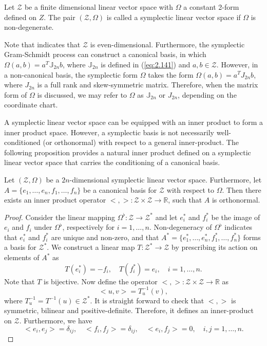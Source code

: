 \begin{definition}
Let $\mathcal Z$ be a finite dimensional linear vector space with $\Omega$ a constant 2-form defined on $Z$. The pair $(\mathcal Z,\Omega)$ is called a symplectic linear vector space if $\Omega$ is non-degenerate.
\end{definition}
Note that  indicates that $\mathcal Z$ is even-dimensional. Furthermore, the symplectic Gram-Schmidt process can construct a canonical basis, in which $\Omega(a,b) = a^T \mathbb J_{2n} b$, where $\mathbb J_{2n}$ is defined in (\ref{eq:2.141}) and $a,b\in \mathcal Z$. However, in a non-canonical basis, the symplectic form $\Omega$ takes the form $\Omega(a,b) = a^TJ_{2n}b$, where $J_{2n}$ is a full rank and skew-symmetric matrix. Therefore, when the matrix form of $\Omega$ is discussed, we may refer to $\Omega$ as $\mathbb J_{2n}$ or $J_{2n}$, depending on the coordinate chart.

A symplectic linear vector space can be equipped with an inner product to form a inner product space. However, a symplectic basis is not necessarily well-conditioned (or orthonormal) with respect to a general inner-product. The following proposition provides a natural inner product defined on a symplectic linear vector space that carries the conditioning of a canonical basis.

\begin{proposition} \label{theorem:2.11}
Let $(\mathcal Z,\Omega)$ be a $2n$-dimensional symplectic linear vector space. Furthermore, let $A = \{ e_1,\dots,e_n,f_1,\dots,f_n \}$ be a canonical basis for $\mathcal Z$ with respect to $\Omega$. Then there exists an inner product operator $<,>:\mathcal Z\times \mathcal Z \to \mathbb R$, such that $A$ is orthonormal.
\end{proposition}

\begin{proof}
Consider the linear mapping $\Omega^{\flat}:\mathcal Z \to \mathcal Z^*$ and let $e_i^*$ and $f_i^*$ be the image of $e_i$ and $f_i$ under $\Omega^{\flat}$, respectively for $i=1,\dots,n$. Non-degeneracy of $\Omega^{\flat}$ indicates that $e_i^*$ and $f_i^*$ are unique and non-zero, and that $A^*=\{e_1^*,\dots,e_n^*,f_1^*,\dots,f_n^*\}$ forms a basis for $\mathcal Z^*$. We construct a linear map $T:\mathcal Z^* \to \mathcal Z$ by prescribing its action on elements of $A^*$ as
\begin{equation*}
	T(e_i^*) = -f_i, \quad T(f_i^*) = e_i, \quad i=1,\dots,n.
\end{equation*}
Note that $T$ is bijective. Now define the operator $<,>:\mathcal Z\times \mathcal Z \to \mathbb R$ as
\begin{equation*}
	<u,v> = T^{-1}_{u} (v),	
\end{equation*}
where $T^{-1}_{u} = T^{-1}(u) \in \mathcal Z^*$. It is straight forward to check that $<,>$ is symmetric, bilinear and positive-definite. Therefore, it defines an inner-product on $\mathcal Z$. Furthermore, we have
\begin{equation*}
	<e_i,e_j> = \delta_{ij},\quad <f_i,f_j> = \delta_{ij}, \quad <e_i,f_j> = 0, \quad i,j=1,\dots,n.
\end{equation*}
\end{proof}

